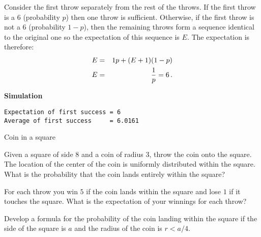 
Consider the first throw separately from the rest of the throws. If the first throw is a $6$ (probability $p$) then one throw is sufficient. Otherwise, if the first throw is not a $6$ (probability $1-p$), then the remaining throws form a sequence identical to the original one so the expectation of this sequence is $E$. The expectation is therefore:
\begin{eqnarray*}
E &=& 1p + (E+1)(1-p)\\
E&=&\displaystyle\frac{1}{p}=6\,.
\end{eqnarray*}

\textbf{Simulation}
\begin{verbatim}
Expectation of first success = 6
Average of first success     = 6.0161
\end{verbatim}



\begin{prob}{Coin in a square}

 Given a square of side $8$ and a coin of radius $3$, throw the coin onto the square. The location of the center of the coin is uniformly distributed within the square. What is the probability that the coin lands entirely within the square?

 For each throw you win $5$ if the coin lands within the square and lose $1$ if it touches the square. What is the expectation of your winnings for each throw?

 Develop a formula for the probability of the coin landing within the square if the side of the square is $a$ and the radius of the coin is $r<a/4$.
\end{prob}

\solution{}

